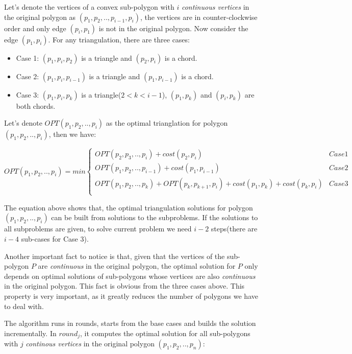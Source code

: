 Let's denote the vertices of a convex sub-polygon with $i$ \textit{continuous vertices} in the original polygon as $(p_1, p_2, .., p_{i-1}, p_i)$, the vertices are in counter-clockwise order and only edge $(p_i, p_1)$ is not in the original polygon. Now consider the edge $(p_1, p_i)$. For any triangulation, there are three cases:

\begin{itemize}
\item{Case 1}: $(p_1, p_i, p_2)$ is a triangle and $(p_2, p_i)$ is a chord.
\item{Case 2}: $(p_1, p_i, p_{i-1})$ is a triangle and  $(p_1, p_{i-1})$ is a chord.
\item{Case 3}: $(p_1, p_i, p_k)$ is a triangle($2 < k < i-1$), $(p_1, p_k)$ and $(p_i, p_k)$ are both chords.
\end{itemize}

Let's denote $OPT(p_1, p_2, .., p_i)$ as the optimal trianglation for polygon $(p_1, p_2, .., p_i)$, then we have:

\[
OPT(p_1, p_2, .., p_i) = min \left\{
  \begin{array}{ll}
    OPT(p_2, p_3, .., p_i) + cost(p_2, p_i) & Case 1 \\
    OPT(p_1, p_2, .., p_{i-1}) + cost(p_1, p_{i-1})  & Case 2 \\
    OPT(p_1, p_2, .., p_k) + OPT(p_k, p_{k+1}, p_i) + cost(p_1, p_k) + cost(p_k, p_i)  & Case 3 \\
  \end{array}\right.
\]

The equation above shows that, the optimal triangulation solutions for polygon $(p_1, p_2, .., p_i)$ can be built from solutions to the subproblems. If the solutions to all subproblems are given, to solve current problem we need $i-2$ steps(there are $i-4$ sub-cases for Case 3).

Another important fact to notice is that, given that the vertices of the sub-polygon $P$ are \textit{continuous} in the original polygon, the optimal solution for $P$ only depends on optimal solutions of sub-polygons whose vertices are also \textit{continuous} in the original polygon. This fact is obvious from the three cases above. This property is very important, as it greatly reduces the number of polygons we have to deal with.

The algorithm runs in rounds, starts from the base cases and builds the solution incrementally. In $round_j$, it computes the optimal solution for all sub-polygons with $j$ \textit{continous vertices} in the original polygon $(p_1, p_2, .., p_n)$:

